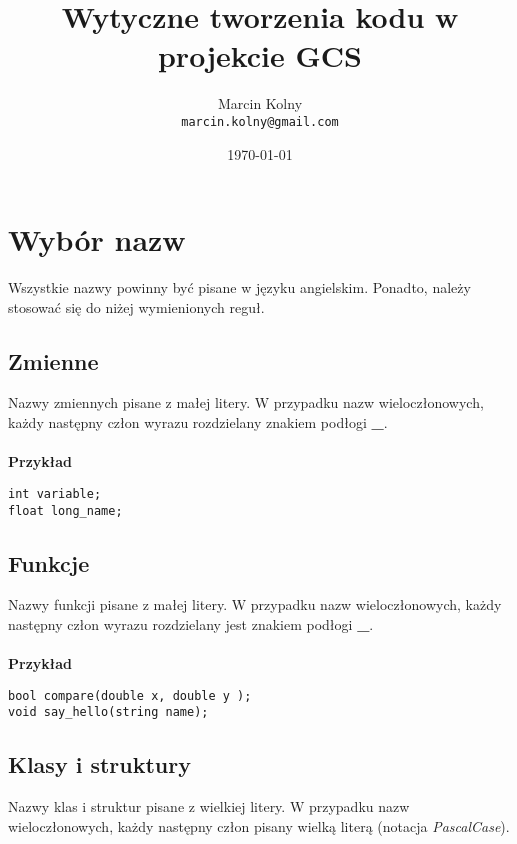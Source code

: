 \documentclass[titlepage]{article}
\title{Wytyczne tworzenia kodu w projekcie GCS}
\author{Marcin Kolny\\
\texttt{marcin.kolny@gmail.com}}
\date{\today}
\begin{document}
\pagestyle{plain}
\maketitle

\tableofcontents
\cleardoublepage
\section{Wybór nazw}
Wszystkie nazwy powinny być pisane w języku angielskim. Ponadto, należy stosować się do niżej wymienionych reguł.
\subsection{Zmienne}
Nazwy zmiennych pisane z małej litery. W przypadku nazw wieloczłonowych, każdy następny człon wyrazu rozdzielany znakiem podłogi \textbf{\_}.
\paragraph{}
\textbf{Przykład}
\begin{lstlisting}
int variable;
float long_name;
\end{lstlisting}
\subsection{Funkcje}
Nazwy funkcji pisane z małej litery. W przypadku nazw wieloczłonowych, każdy następny człon wyrazu rozdzielany jest znakiem podłogi \textbf{\_}.
\paragraph{}
\textbf{Przykład}
\begin{lstlisting}
bool compare(double x, double y );
void say_hello(string name);
\end{lstlisting}
\subsection{Klasy i struktury}
Nazwy klas i struktur pisane z wielkiej litery. W przypadku nazw wieloczłonowych, każdy następny człon pisany wielką literą (notacja \textit{PascalCase}).
\end{document}
